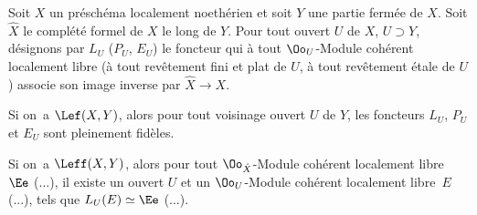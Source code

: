 \begin{proposition} \label{X.2.3}
Soit $X$ un pr\'esch\'ema localement noeth\'erien et soit $Y$ une partie ferm\'ee de $X$. Soit $\hat{X}$ le compl\'et\'e formel de $X$ le long de $Y$. Pour tout ouvert $U$ de $X$, $U\supset Y$, d\'esignons par $L_U$ (\resp $P_U$, \resp $E_U$) le foncteur qui \`a tout $\Oo_U$-Module coh\'erent localement libre (\resp \`a tout rev\^etement fini et plat de $U$, \resp \`a tout rev\^etement \'etale de $U$) associe son image inverse par $\hat{X} \to X$.
\begin{enumeratei}
\item
Si on~a $\Lef(X, Y)$, alors pour tout voisinage ouvert $U$ de $Y$, les foncteurs $L_U$, $P_U$ et $E_U$ sont pleinement fid\`eles.

\item
Si on~a $\Leff(X, Y)$, alors pour tout $\Oo_{\hat{X}}$-Module coh\'erent localement libre~$\Ee$ (\resp ...), il existe un ouvert $U$ et un $\Oo_U$-Module coh\'erent localement libre~$E$ (\resp ...), tels que $L_U(E) \simeq \Ee$ (\resp ...).
\end{enumeratei}
\end{proposition}
